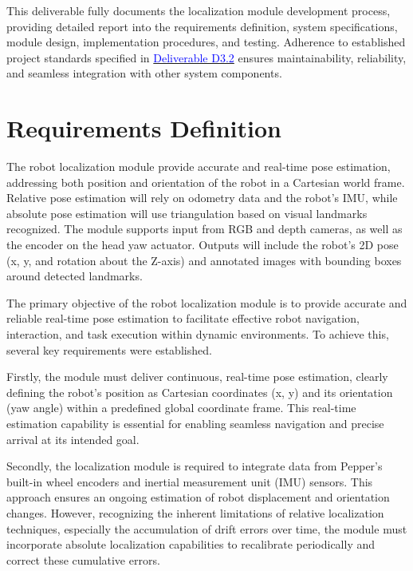 \documentclass{CSSRforAfrica}
\begin{document}
This deliverable fully documents the localization module development process, providing detailed report into the requirements definition, system specifications, module design, implementation procedures, and testing. Adherence to established project standards specified in \href{https://cssr4africa.github.io/deliverables/CSSR4Africa_Deliverable_D3.2.pdf}{\textcolor{blue}{Deliverable D3.2}} ensures maintainability, reliability, and seamless integration with other system components.

\newpage

\section{Requirements Definition}
The robot localization module provide accurate and real-time pose estimation, addressing both position and orientation of the robot in a Cartesian world frame. Relative pose estimation will rely on odometry data and the robot’s IMU, while absolute pose estimation will use triangulation based on visual landmarks recognized. The module supports input from RGB and depth cameras, as well as the encoder on the head yaw actuator. Outputs will include the robot’s 2D pose (x, y, and rotation about the Z-axis) and annotated images with bounding boxes around detected landmarks.

The primary objective of the robot localization module is to provide accurate and reliable real-time pose estimation to facilitate effective robot navigation, interaction, and task execution within dynamic environments. To achieve this, several key requirements were established.

Firstly, the module must deliver continuous, real-time pose estimation, clearly defining the robot’s position as Cartesian coordinates (x, y) and its orientation (yaw angle) within a predefined global coordinate frame. This real-time estimation capability is essential for enabling seamless navigation and precise arrival at its intended goal.

Secondly, the localization module is required to integrate data from Pepper’s built-in wheel encoders and inertial measurement unit (IMU) sensors. This approach ensures an ongoing estimation of robot displacement and orientation changes. However, recognizing the inherent limitations of relative localization techniques, especially the accumulation of drift errors over time, the module must incorporate absolute localization capabilities to recalibrate periodically and correct these cumulative errors.
\end{document}
